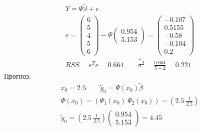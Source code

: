 \documentclass{article}
\begin{document}
\begin{eg}
  \begin{gather*}
    Y=\Psi \tilde{\beta}+e \\ 
    e = \begin{pmatrix}
      6 \\ 5 \\ 4 \\ 5 \\ 6 
    \end{pmatrix} - \Psi \begin{pmatrix}
      0.954 \\ 5.153
    \end{pmatrix} = \begin{pmatrix}
      -0.107 \\ 0.5155 \\ -0.58 \\ -0.104 \\ 0.2
    \end{pmatrix} \\ 
    RSS=e^{T}e=0.664 \qquad \tilde{\sigma^{2}}=\frac{0.664}{5-2}=0.221
  \end{gather*}
  Прогноз:
  \begin{gather*}
    x_0 = 2.5 \qquad \tilde y_0=\Psi(x_0)\tilde{\beta} \\ 
    \Psi(x_0) = (\Psi_1(x_0) \ \Psi_2(x_0))=(2.5 \ \frac{1}{2.5})  \\ 
    \tilde y_0 = (2.5 \ \frac{1}{2.5})\begin{pmatrix}
      0.954 \\ 5.153
    \end{pmatrix} = 4.45
  \end{gather*}
\end{eg}
\end{document}
